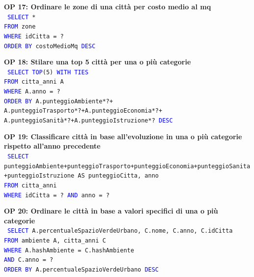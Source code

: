 \documentclass[a4paper,12pt]{report}
\begin{document}
            \noindent
            \textbf{OP 17: Ordinare le zone di una città per costo medio al mq} \\
            \texttt{
                \textcolor{blue}{SELECT} * \\
                \textcolor{blue}{FROM} zone \\
                \textcolor{blue}{WHERE} idCitta = ? \\
                \textcolor{blue}{ORDER BY} costoMedioMq \textcolor{blue}{DESC} \\
            }

            \noindent
            \textbf{OP 18: Stilare una top 5 città per una o più categorie} \\
            \texttt{
                \textcolor{blue}{SELECT TOP}(5) \textcolor{blue}{WITH TIES} \\
                \textcolor{blue}{FROM} citta\_anni A\\
                \textcolor{blue}{WHERE} A.anno = ? \\
                \textcolor{blue}{ORDER BY} A.punteggioAmbiente*?+ \\
                A.punteggioTrasporto*?+A.punteggioEconomia*?+ \\
                A.punteggioSanità*?+A.punteggioIstruzione*? \textcolor{blue}{DESC} \\
            }
            
            \noindent
            \textbf{OP 19: Classificare città in base all’evoluzione in una o più categorie rispetto all’anno precedente} \\
            \texttt{
                \textcolor{blue}{SELECT} punteggioAmbiente+punteggioTrasporto+punteggioEconomia+punteggioSanita+punteggioIstruzione AS punteggioCitta, anno \\
                \textcolor{blue}{FROM} citta\_anni \\
                \textcolor{blue}{WHERE} idCitta = ? \textcolor{blue}{AND} anno = ? \\
            }
            
            \noindent
            \textbf{OP 20: Ordinare le città in base a valori specifici di una o più categorie} \\
            \texttt{
                \textcolor{blue}{SELECT} A.percentualeSpazioVerdeUrbano, C.nome, C.anno, C.idCitta \\
                \textcolor{blue}{FROM} ambiente A, citta\_anni C \\
                \textcolor{blue}{WHERE} A.hashAmbiente = C.hashAmbiente  \\
                \textcolor{blue}{AND} C.anno = ? \\
                \textcolor{blue}{ORDER BY} A.percentualeSpazioVerdeUrbano \textcolor{blue}{DESC} \\
            }
            
\end{document}
